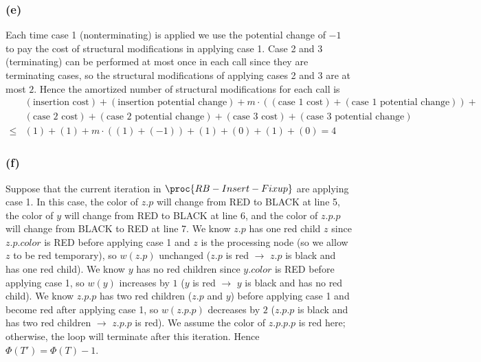 \subsubsection*{(e)}

Each time case 1 (nonterminating) is applied
we use the potential change of $-1$ to 
pay the cost of structural modifications in applying case 1.
Case 2 and 3 (terminating) can be performed at most once 
in each call since they are terminating cases,
so the structural modifications of applying cases 2 and 3 are at most $2$.
Hence the amortized number of structural modifications for each call is
\begin{equation*}
\begin{split}
    & (\text{insertion cost}) + (\text{insertion potential change}) + 
    m \cdot ((\text{case 1 cost}) + (\text{case 1 potential change})) + \\
    & (\text{case 2 cost}) + (\text{case 2 potential change}) + 
    (\text{case 3 cost}) + (\text{case 3 potential change}) \\
    \leq & (1) + (1) + m \cdot ((1) + (-1)) + (1) + (0) + (1) + (0)
    = 4
\end{split}
\end{equation*}

\subsubsection*{(f)}

Suppose that the current iteration in $\proc{RB-Insert-Fixup}$ are applying case 1.
In this case, the color of $z.p$ will change from RED to BLACK at line 5,
the color of $y$ will change from RED to BLACK at line 6,
and the color of $z.p.p$ will change from BLACK to RED at line 7.
We know $z.p$ has one red child $z$ since $z.p.color$ is RED before applying case 1
and $z$ is the processing node (so we allow $z$ to be red temporary),
so $w(z.p)$ unchanged ($z.p$ is red $\rightarrow$ $z.p$ is black and has one red child).
We know $y$ has no red children since $y.color$ is RED before applying case 1,
so $w(y)$ increases by $1$ ($y$ is red $\rightarrow$ $y$ is black and has no red child).
We know $z.p.p$ has two red children ($z.p$ and $y$) before applying case 1
and become red after applying case 1,
so $w(z.p.p)$ decreases by $2$ 
($z.p.p$ is black and has two red children $\rightarrow$ $z.p.p$ is red).
We assume the color of $z.p.p.p$ is red here;
otherwise, the loop will terminate after this iteration.
Hence $\Phi(T') = \Phi(T) - 1$.

